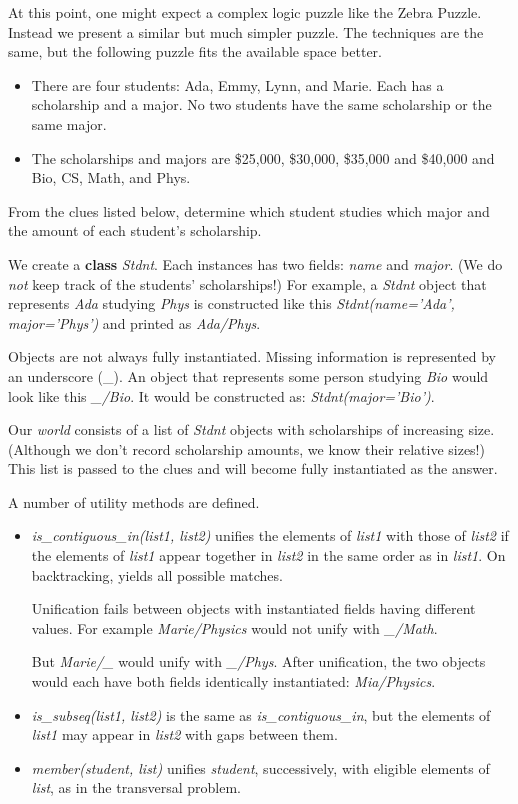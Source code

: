 At this point, one might expect a complex logic puzzle like the Zebra Puzzle\cite{ZebraPuzzle}. Instead we present a similar but much simpler puzzle. The techniques are the same, but the following puzzle\cite{ScholarshipPuzzle} fits the available space better. 

\begin{itemize}
    \item There are four students: Ada, Emmy, Lynn, and Marie. Each has a scholarship and a major.  No two students have the same scholarship or the same major. 
    \item The scholarships and majors are \$25,000, \$30,000, \$35,000 and \$40,000 and Bio, CS, Math, and Phys. 
\end{itemize}

From the clues listed below, determine which student studies which major and the amount of each student's scholarship.

We create a \textbf{class} \textit{Stdnt}. Each instances has two fields: \textit{name} and \textit{major}. (We do \textit{not} keep track of the students' scholarships!) For example, a \textit{Stdnt} object that represents \textit{Ada} studying \textit{Phys} is constructed like this \textit{Stdnt(name='Ada', major='Phys')} and printed as \textit{Ada/Phys}. 

Objects are not always fully instantiated. Missing information is represented by an underscore (\_). An object that represents some person studying \textit{Bio} would look like this \textit{\_/Bio}. It would be constructed as: \textit{Stdnt(major='Bio')}.

Our \textit{world} consists of a list of \textit{Stdnt} objects with scholarships of increasing size. (Although we don't record scholarship amounts, we know their relative sizes!) This list is passed to the clues and will become fully instantiated as the answer.

A number of utility methods are defined.
\begin{itemize}
    \item \textit{is\_contiguous\_in(list1, list2)} unifies the elements of \textit{list1} with those of \textit{list2} if the elements of \textit{list1} appear together in \textit{list2} in the same order as in \textit{list1}. On backtracking, yields all possible matches. 
    
    \smallv
    Unification fails between objects with instantiated fields having different values. For example \textit{Marie/Physics} would not unify with \textit{\_/Math}.
    
    \smallv
    But \textit{Marie/\_} would unify with \textit{\_/Phys}. After unification, the two objects would each have both fields identically instantiated: \textit{Mia/Physics}.
    
    \item \textit{is\_subseq(list1, list2)} is the same as \textit{is\_contiguous\_in}, but the elements of \textit{list1} may appear in \textit{list2} with gaps between them.
    \item \textit{member(student, list)} unifies \textit{student}, successively, with eligible elements of \textit{list}, as in the transversal problem.
\end{itemize}

